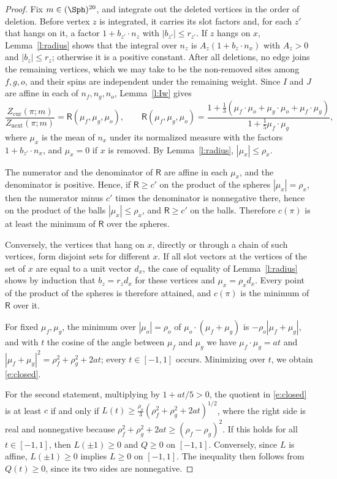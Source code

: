\begin{proof}
Fix $m \in (\Sph)^{20}$, and integrate out the deleted vertices in the order of deletion. Before vertex $z$ is integrated, it carries its slot factors and, for each $z'$ that hangs on it, a factor $1 + b_{z'} \cdot n_z$ with $|b_{z'}| \le r_{z'}$. If $z$ hangs on $x$, Lemma~\ref{l:radius} shows that the integral over $n_z$ is $A_z (1 + b_z \cdot n_x)$ with $A_z > 0$ and $|b_z| \le r_z$; otherwise it is a positive constant. After all deletions, no edge joins the remaining vertices, which we may take to be the non-removed sites among $f, g, o$, and their spins are independent under the remaining weight. Since $I$ and $J$ are affine in each of $n_f, n_g, n_o$, Lemma~\ref{l:Iw} gives
\begin{equation}\label{e:Rmu}
\frac{Z_{\mathrm{cur}}(\pi; m)}{Z_{\mathrm{next}}(\pi; m)} = \mathsf R(\mu_f, \mu_g, \mu_o), \qquad \mathsf R(\mu_f, \mu_g, \mu_o) = \frac{1 + \frac13 (\mu_f \cdot \mu_o + \mu_g \cdot \mu_o + \mu_f \cdot \mu_g)}{1 + \frac15 \mu_f \cdot \mu_g} ,
\end{equation}
where $\mu_x$ is the mean of $n_x$ under its normalized measure with the factors $1 + b_{z'} \cdot n_x$, and $\mu_x = 0$ if $x$ is removed. By Lemma~\ref{l:radius}, $|\mu_x| \le \rho_x$.

The numerator and the denominator of $\mathsf R$ are affine in each $\mu_x$, and the denominator is positive. Hence, if $\mathsf R \ge c'$ on the product of the spheres $|\mu_x| = \rho_x$, then the numerator minus $c'$ times the denominator is nonnegative there, hence on the product of the balls $|\mu_x| \le \rho_x$, and $\mathsf R \ge c'$ on the balls. Therefore $c(\pi)$ is at least the minimum of $\mathsf R$ over the spheres.

Conversely, the vertices that hang on $x$, directly or through a chain of such vertices, form disjoint sets for different $x$. If all slot vectors at the vertices of the set of $x$ are equal to a unit vector $d_x$, the case of equality of Lemma~\ref{l:radius} shows by induction that $b_z = r_z d_x$ for these vertices and $\mu_x = \rho_x d_x$. Every point of the product of the spheres is therefore attained, and $c(\pi)$ is the minimum of $\mathsf R$ over it.

For fixed $\mu_f, \mu_g$, the minimum over $|\mu_o| = \rho_o$ of $\mu_o \cdot (\mu_f + \mu_g)$ is $-\rho_o |\mu_f + \mu_g|$, and with $t$ the cosine of the angle between $\mu_f$ and $\mu_g$ we have $\mu_f \cdot \mu_g = at$ and $|\mu_f + \mu_g|^2 = \rho_f^2 + \rho_g^2 + 2at$; every $t \in [-1, 1]$ occurs. Minimizing over $t$, we obtain \eqref{e:closed}.

For the second statement, multiplying by $1 + at/5 > 0$, the quotient in \eqref{e:closed} is at least $c$ if and only if $L(t) \ge \frac{\rho_o}{3} (\rho_f^2 + \rho_g^2 + 2at)^{1/2}$, where the right side is real and nonnegative because $\rho_f^2 + \rho_g^2 + 2at \ge (\rho_f - \rho_g)^2$. If this holds for all $t \in [-1, 1]$, then $L(\pm 1) \ge 0$ and $Q \ge 0$ on $[-1, 1]$. Conversely, since $L$ is affine, $L(\pm 1) \ge 0$ implies $L \ge 0$ on $[-1, 1]$. The inequality then follows from $Q(t) \ge 0$, since its two sides are nonnegative.
\end{proof}

